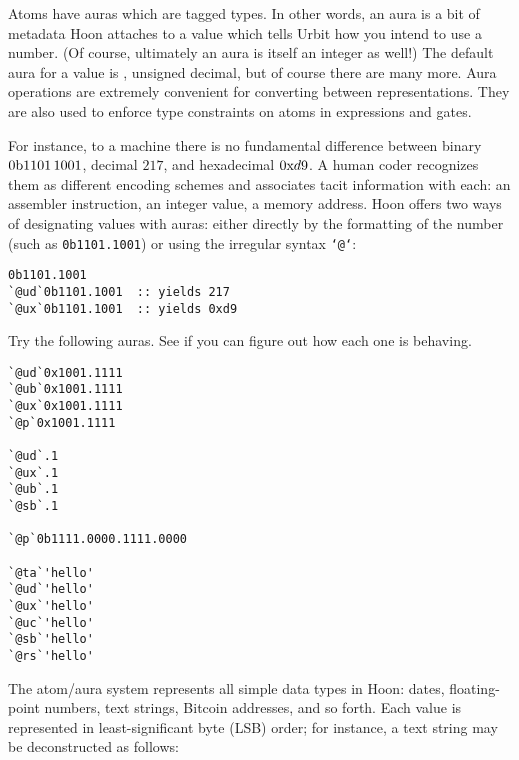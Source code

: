 Atoms have auras which are tagged types.  In other words, an aura is a bit of metadata Hoon attaches to a value which tells Urbit how you intend to use a number.  (Of course, ultimately an aura is itself an integer as well!)  The default aura for a value is \patud, unsigned decimal, but of course there are many more.  Aura operations are extremely convenient for converting between representations.  They are also used to enforce type constraints on atoms in expressions and gates.

For instance, to a machine there is no fundamental difference between binary $\ub 1101\,1001$, decimal $217$, and hexadecimal $\ux d9$.  A human coder recognizes them as different encoding schemes and associates tacit information with each:  an assembler instruction, an integer value, a memory address.  Hoon offers two ways of designating values with auras:  either directly by the formatting of the number (such as \texttt{0b1101.1001}) or using the irregular syntax \texttt{`@`}:

\begin{lstlisting}
0b1101.1001
`@ud`0b1101.1001  :: yields 217
`@ux`0b1101.1001  :: yields 0xd9
\end{lstlisting}

\begin{example}
Try the following auras.  See if you can figure out how each one is behaving.

\begin{lstlisting}
`@ud`0x1001.1111
`@ub`0x1001.1111
`@ux`0x1001.1111
`@p`0x1001.1111

`@ud`.1
`@ux`.1
`@ub`.1
`@sb`.1

`@p`0b1111.0000.1111.0000

`@ta`'hello'
`@ud`'hello'
`@ux`'hello'
`@uc`'hello'
`@sb`'hello'
`@rs`'hello'
\end{lstlisting}
\end{example}

The atom/aura system represents all simple data types in Hoon:  dates, floating-point numbers, text strings, Bitcoin addresses, and so forth.  Each value is represented in least-significant byte (LSB) order; for instance, a text string may be deconstructed as follows:

